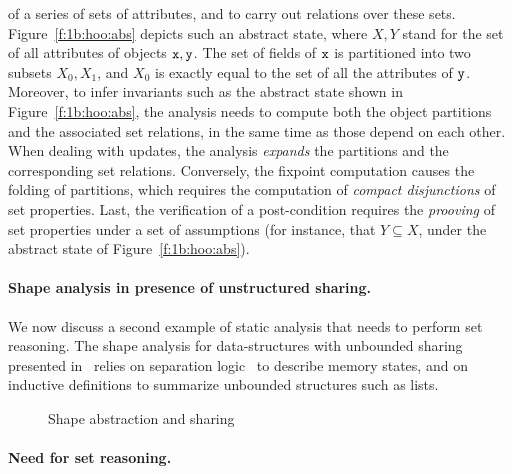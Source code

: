 of a series of sets of attributes, and to carry out relations over these
sets.
Figure~\ref{f:1b:hoo:abs} depicts such an abstract state, where \( X, Y \)
stand for the set of all attributes of objects \( \mathtt{x}, \mathtt{y} \).
The set of fields of \( \mathtt{x} \) is partitioned into two subsets \( X_0,
X_1 \), and \( X_0 \) is exactly equal to the set of all the attributes
of \( \mathtt{y} \).
Moreover, to infer invariants such as the abstract state shown in
Figure~\ref{f:1b:hoo:abs}, the analysis needs to compute both the
object partitions and the associated set relations, in the same time
as those depend on each other.
When dealing with updates, the analysis {\em expands} the partitions and the
corresponding set relations.
Conversely, the fixpoint computation causes the folding of partitions,
which requires the computation of {\em compact disjunctions} of set
properties.
Last, the verification of a post-condition requires the {\em prooving}
of set properties under a set of assumptions (for instance, that \( Y
\subseteq X \), under the abstract state of Figure~\ref{f:1b:hoo:abs}).

\paragraph{Shape analysis in presence of unstructured sharing.}
We now discuss a second example of static analysis that needs to perform
set reasoning.
The shape analysis for data-structures with unbounded sharing presented
in~\cite{memcad:15:sas} relies on separation logic~\cite{r:lics:02} to
describe memory states, and on inductive definitions to summarize
unbounded structures such as lists.
\begin{figure}[t]
  \quad
  \caption{Shape abstraction and sharing}
  \label{f:2:memcad}
\end{figure}

\paragraph{Need for set reasoning.}
